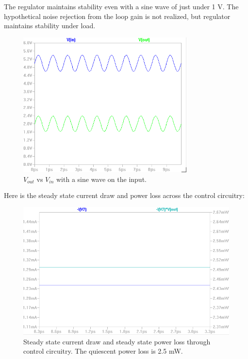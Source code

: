 \documentclass[10pt]{amsart}
\begin{document}
\newpage

The regulator maintains stability even with a sine wave of just under 1 V. The hypothetical noise rejection from the loop gain is not realized, but regulator maintains stability under load.

\begin{figure}[h]
	\begin{center}
		\includegraphics[width=3.5in]{Media/sin.png}
	\end{center}
	\caption{$V_{out} $ vs $V_{in}$ with a sine wave on the input.}
	\label{fig:pidfb}
\end{figure}

Here is the steady state current draw and power loss across the control circuitry:

\begin{figure}[h]
	\begin{center}
		\includegraphics[width=4.5in]{Media/pwr.png}
	\end{center}
	\caption{Steady state current draw and steady state power loss through control circuitry. The quiescent power loss is 2.5 mW.}
	\label{fig:pidfb}
\end{figure}
\end{document}
